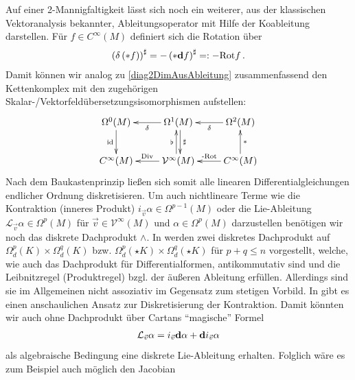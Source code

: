   \begin{fazit}
    Auf einer 2-Mannigfaltigkeit lässt sich noch ein weiterer, aus der klassischen Vektoranalysis
    bekannter, Ableitungsoperator mit Hilfe der Koableitung darstellen.
    Für \( f\in C^{\infty}(M) \) definiert sich die Rotation über
    \begin{align}
      \left( \delta\left( *f \right) \right)^{\sharp} = -\left( *\mathbf{d} f \right)^{\sharp} =: -\text{Rot} f \,\text{.}
    \end{align}
    Damit können wir analog zu \eqref{diag2DimAusAbleitung} zusammenfassend den Kettenkomplex mit den zugehörigen Skalar-/Vektorfeldübersetzungsisomorphismen aufstellen:
    \begin{align}
      \begin{xy} \xymatrix{
        \Omega^{0}(M) \ar[d]_{\text{id}} & \Omega^{1}(M) \ar[l]^{\delta} \ar@<2pt>[d]^{\sharp} & \Omega^{2}(M) \ar[l]^{\delta}\\
        C^{\infty}(M) & \mathcal{V}^{\infty}(M) \ar[l]_{\text{Div}} \ar@<2pt>[u]^{\flat} & C^{\infty}(M) \ar[l]_{\text{-Rot}} \ar[u]_{*} }
      \end{xy}
    \end{align}
    Nach dem Baukastenprinzip ließen sich somit alle linearen Differentialgleichungen endlicher Ordnung diskretisieren.
    Um auch nichtlineare Terme wie die Kontraktion (inneres Produkt) \( i_{\vec{v}}\alpha\in\Omega^{p-1}(M) \) 
    oder die Lie-Ableitung \( \mathcal{L}_{\vec{v}}\alpha\in\Omega^{p}(M) \) 
    für \( \vec{v}\in\mathcal{V}^{\infty}(M) \) und \( \alpha\in\Omega^{p}(M) \) darzustellen
    benötigen wir noch das diskrete Dachprodukt \( \wedge \).
    In \cite{desbrun} werden zwei diskretes Dachprodukt auf \( \Omega_{d}^{p}(K)\times\Omega_{d}^{q}(K) \) bzw. \( \Omega_{d}^{p}(\star K)\times\Omega_{d}^{q}(\star K) \)
    für \( p+q\le n \) vorgestellt, welche, wie auch das Dachprodukt für Differentialformen, antikommutativ sind und die Leibnitzregel (Produktregel) bzgl. der äußeren Ableitung erfüllen.
    Allerdings sind sie im Allgemeinen nicht assoziativ im Gegensatz zum stetigen Vorbild.
    In \cite{diskreteLie} gibt es einen anschaulichen Ansatz zur Diskretisierung der Kontraktion.
    Damit könnten wir auch ohne Dachprodukt über Cartans "`magische"' Formel
    \begin{align}
      \mathcal{L}_{\vec{v}}\alpha = i_{\vec{v}}\mathbf{d}\alpha + \mathbf{d} i_{\vec{v}}\alpha 
    \end{align}
    als algebraische Bedingung eine diskrete Lie-Ableitung erhalten.
    Folglich wäre es zum Beispiel auch möglich den Jacobian

\end{fazit}
